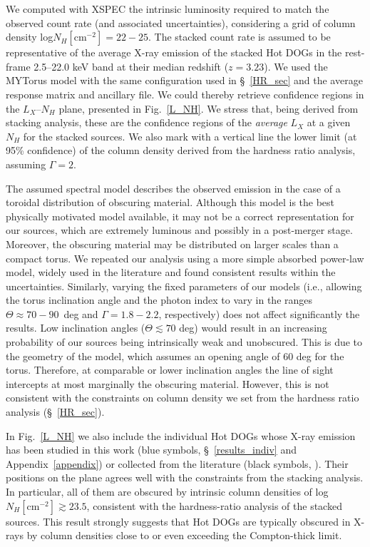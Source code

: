 \documentclass[useAMS,usenatbib]{mnras}
\newcommand*{\nhunits}{\mathrm{cm^{-2}}}
\begin{document}
We computed with XSPEC the intrinsic luminosity required to match the observed count rate (and associated uncertainties), considering a grid of column density log$N_H[\nhunits]=22-25$. The stacked count rate is assumed to be representative of the average X-ray emission of the stacked Hot DOGs in the rest-frame 2.5--22.0 keV band at their median redshift ($z=3.23$).
We used the MYTorus model with the same configuration used in \S~\ref{HR_sec} and the average response matrix and ancillary file.
We could thereby retrieve confidence regions in the $L_X$--$N_H$ plane, presented in Fig.~\ref{L_NH}. We stress that, being derived from stacking analysis, these are the confidence regions of the \textit{average} $L_X$ at a given $N_H$ for the stacked sources. We also mark with a vertical line the lower limit (at 95\% confidence) of the column density derived from the hardness ratio analysis, assuming $\Gamma=2$.


The assumed spectral model describes the observed emission in the case of a toroidal distribution of obscuring material. Although this model is the best physically motivated model available, it may not be a correct representation for our sources, which are extremely luminous and possibly in a post-merger stage. Moreover, the obscuring material may be distributed on larger scales than a compact torus. We repeated our analysis using a more simple absorbed power-law model, widely used in the literature \cite[e.g., see][for a recent example involving luminous QSOs]{Martocchia17} and found consistent results within the uncertainties. Similarly, varying the fixed parameters of our models (i.e., allowing the torus inclination angle and the photon index to vary in the ranges $\Theta\approx70-90$~deg and $\Gamma=1.8-2.2$, respectively) does not affect significantly the results. Low inclination angles ($\Theta\lesssim70$ deg) would result in an increasing probability of our sources being intrinsically weak and unobscured. This is due to the geometry of the model, which assumes an opening angle of $60$ deg for the torus. Therefore, at comparable or lower inclination angles the line of sight intercepts at most marginally the obscuring material. However, this is not consistent with the constraints on column density we set from the hardness ratio analysis (\S~\ref{HR_sec}).

In Fig.~\ref{L_NH} we also include the individual Hot DOGs whose X-ray emission has been studied in this work (blue symbols, \S~\ref{results_indiv} and Appendix~\ref{appendix}) or collected from the literature (black symbols, \citealt{Stern14, Assef16, RicciC17}). Their positions on the plane agrees well with the constraints from the stacking analysis. In particular, all of them are obscured by intrinsic column densities of log$N_H[\nhunits]\gtrsim23.5$, consistent with the hardness-ratio analysis of the stacked sources. This result strongly suggests that Hot DOGs are typically obscured in X-rays by column densities close to or even exceeding the Compton-thick limit.
\end{document}
